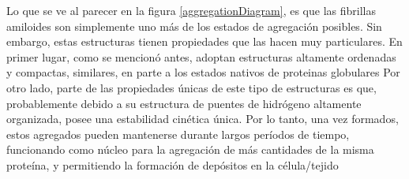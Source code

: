 Lo que se ve al parecer en la figura \ref{aggregationDiagram}, es que las fibrillas amiloides son simplemente uno más de los estados de agregación posibles.
Sin embargo, estas estructuras tienen propiedades que las hacen muy particulares.
En primer lugar, como se mencionó antes, adoptan estructuras altamente ordenadas y compactas, similares, en parte a los estados nativos de proteinas globulares
Por otro lado, parte de las propiedades únicas de este tipo de estructuras es que, probablemente debido a su estructura de puentes de hidrógeno altamente organizada, posee una estabilidad cinética única.
Por lo tanto, una vez formados, estos agregados pueden mantenerse durante largos períodos de tiempo, funcionando como núcleo para la agregación de más cantidades de la misma proteína, 
y permitiendo la formación de depósitos en la célula/tejido




